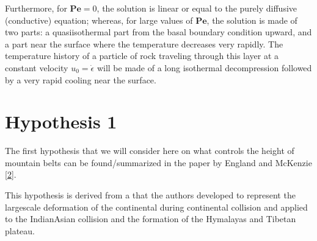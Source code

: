 \documentclass[letterpaper,10pt,english]{jupyterBook}
\let\sphinxpxdimen\pdfpxdimen\else\newdimen\sphinxpxdimen
\begin{document}
\sphinxAtStartPar
Furthermore, for \(\mathbf{Pe}=0\), the solution is linear or equal to the purely diffusive (conductive) equation; whereas, for large values of \(\mathbf{Pe}\), the solution is made of two parts: a quasi\sphinxhyphen{}isothermal part from the basal boundary condition upward, and a part near the surface where the temperature decreases very rapidly. The temperature history of a particle of rock traveling through this layer at a constant velocity \(u_0=\dot\epsilon\) will be made of a long isothermal decompression followed by a very rapid cooling near the surface.

\sphinxstepscope


\chapter{Hypothesis 1}
\label{\detokenize{hypothesis1:hypothesis-1}}\label{\detokenize{hypothesis1::doc}}
\sphinxAtStartPar
The first hypothesis that we will consider here on what controls the height of mountain belts can be found/summarized in the paper by England and McKenzie {[}\hyperlink{cite.references:id6}{2}{]}.

\begin{figure}[htbp]
\centering

\noindent\sphinxincludegraphics[height=800\sphinxpxdimen]{{england-mckenzie-page}.png}
\end{figure}

\sphinxAtStartPar
This hypothesis is derived from a {\hyperref[\detokenize{thinsheet:thin-sheet-section}]{}} that the authors developed to represent the large\sphinxhyphen{}scale deformation of the continental {\hyperref[\detokenize{glossary:term-Lithosphere}]{}} during continental collision and applied to the Indian\sphinxhyphen{}Asian collision and the formation of the Hymalayas and Tibetan plateau.
\end{document}
